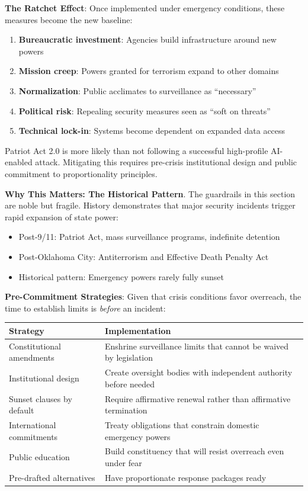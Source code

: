 \documentclass[11pt,letterpaper]{article}
\begin{document}
\textbf{The Ratchet Effect}: Once implemented under emergency conditions, these measures become the new baseline:
\begin{enumerate}
  \item \textbf{Bureaucratic investment}: Agencies build infrastructure around new powers
  \item \textbf{Mission creep}: Powers granted for terrorism expand to other domains
  \item \textbf{Normalization}: Public acclimates to surveillance as ``necessary''
  \item \textbf{Political risk}: Repealing security measures seen as ``soft on threats''
  \item \textbf{Technical lock-in}: Systems become dependent on expanded data access
\end{enumerate}

\begin{warnbox}
Patriot Act 2.0 is more likely than not following a successful high-profile AI-enabled attack. Mitigating this requires pre-crisis institutional design and public commitment to proportionality principles.
\end{warnbox}

\textbf{Why This Matters: The Historical Pattern}. The guardrails in this section are noble but fragile. History demonstrates that major security incidents trigger rapid expansion of state power:
\begin{itemize}
  \item Post-9/11: Patriot Act, mass surveillance programs, indefinite detention
  \item Post-Oklahoma City: Antiterrorism and Effective Death Penalty Act
  \item Historical pattern: Emergency powers rarely fully sunset
\end{itemize}

\textbf{Pre-Commitment Strategies}: Given that crisis conditions favor overreach, the time to establish limits is \textit{before} an incident:

\begin{center}
\small
\begin{tabular}{L{4cm}L{8cm}}
\toprule
\textbf{Strategy} & \textbf{Implementation} \\
\midrule
Constitutional amendments & Enshrine surveillance limits that cannot be waived by legislation \\
Institutional design & Create oversight bodies with independent authority before needed \\
Sunset clauses by default & Require affirmative renewal rather than affirmative termination \\
International commitments & Treaty obligations that constrain domestic emergency powers \\
Public education & Build constituency that will resist overreach even under fear \\
Pre-drafted alternatives & Have proportionate response packages ready \\
\bottomrule
\end{tabular}
\end{center}
\end{document}
